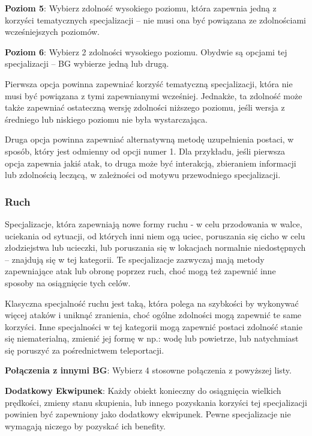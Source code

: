 \textbf{Poziom 5}: Wybierz zdolność wysokiego poziomu, która zapewnia jedną z korzyści tematycznych specjalizacji – nie musi ona być powiązana ze zdolnościami wcześniejszych poziomów.

\textbf{Poziom 6}: Wybierz 2 zdolności wysokiego poziomu. Obydwie są opcjami tej specjalizacji – BG wybierze jedną lub drugą. 

Pierwsza opcja powinna zapewniać korzyść tematyczną specjalizacji, która nie musi być powiązana z tymi zapewnianymi wcześniej. Jednakże, ta zdolność może także zapewniać ostateczną wersję zdolności niższego poziomu, jeśli wersja z średniego lub niskiego poziomu nie była wystarczająca.

Druga opcja powinna zapewniać alternatywną metodę uzupełnienia postaci, w sposób, który jest odmienny od opcji numer 1. Dla przykładu, jeśli pierwsza opcja zapewnia jakiś atak, to druga może być interakcją, zbieraniem informacji lub zdolnością leczącą, w zależności od motywu przewodniego specjalizacji. 

\subsubsection{Ruch}

Specjalizacje, która zapewniają nowe formy ruchu - w celu przodowania w walce, uciekania od sytuacji, od których inni niem ogą uciec, poruszania się cicho w celu złodziejstwa lub ucieczki, lub poruszania się w lokacjach normalnie niedostępnych – znajdują się w tej kategorii. Te specjalizacje zazwyczaj mają metody zapewniające atak lub obronę poprzez ruch, choć mogą też zapewnić inne sposoby na osiągnięcie tych celów. 

Klasyczna specjalność ruchu jest taką, która polega na szybkości by wykonywać więcej ataków i uniknąć zranienia, choć ogólne zdolności mogą zapewnić te same korzyści. Inne specjalności w tej kategorii mogą zapewnić postaci zdolność stanie się niematerialną, zmienić jej formę w np.: wodę lub powietrze, lub natychmiast się poruszyć za pośrednictwem teleportacji.

\textbf{Połączenia z innymi BG}: Wybierz 4 stosowne połączenia z powyższej listy.

\textbf{Dodatkowy Ekwipunek}: Każdy obiekt konieczny do osiągnięcia wielkich prędkości, zmieny stanu skupienia, lub innego pozyskania korzyści tej specjalizacji powinien być zapewniony jako dodatkowy ekwipunek. Pewne specjalizacje nie wymagają niczego by pozyskać ich benefity.

